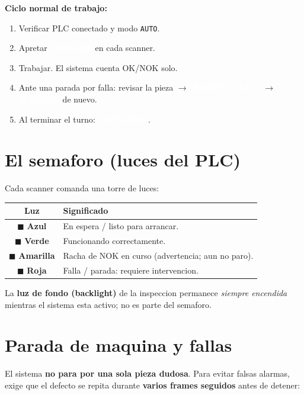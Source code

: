 \documentclass[11pt,a4paper]{article}
\newcommand{\btn}[1]{\colorbox{ink}{\textcolor{white}{\small\,\textbf{#1}\,}}}
\begin{document}
\textbf{Ciclo normal de trabajo:}
\begin{enumerate}[leftmargin=1.5em]
  \item Verificar \textcolor{okGreen}{PLC conectado} y modo \texttt{AUTO}.
  \item Apretar \btn{INICIAR} en cada scanner.
  \item Trabajar. El sistema cuenta OK/NOK solo.
  \item Ante una parada por falla: revisar la pieza $\to$ \btn{RESET FALLA}
        $\to$ \btn{INICIAR} de nuevo.
  \item Al terminar el turno: \btn{DETENER}.
\end{enumerate}

\section{El semaforo (luces del PLC)}
Cada scanner comanda una torre de luces:

\begin{center}
\renewcommand{\arraystretch}{1.4}
\begin{tabular}{c >{\raggedright\arraybackslash}p{11.5cm}}
\toprule
\textbf{Luz} & \textbf{Significado}\\
\midrule
\textcolor{idleBlue}{$\blacksquare$} \textbf{Azul} & En espera / listo para arrancar.\\
\textcolor{okGreen}{$\blacksquare$} \textbf{Verde} & Funcionando correctamente.\\
\textcolor{warnAmber}{$\blacksquare$} \textbf{Amarilla} & Racha de NOK en curso (advertencia; aun no paro).\\
\textcolor{nokRed}{$\blacksquare$} \textbf{Roja} & Falla / parada: requiere intervencion.\\
\bottomrule
\end{tabular}
\end{center}

\begin{infobox}
La \textbf{luz de fondo (backlight)} de la inspeccion permanece \emph{siempre
encendida} mientras el sistema esta activo; no es parte del semaforo.
\end{infobox}

\section{Parada de maquina y fallas}\label{sec:parada}
El sistema \textbf{no para por una sola pieza dudosa}. Para evitar falsas
alarmas, exige que el defecto se repita durante \textbf{varios frames
seguidos} antes de detener:
\end{document}
